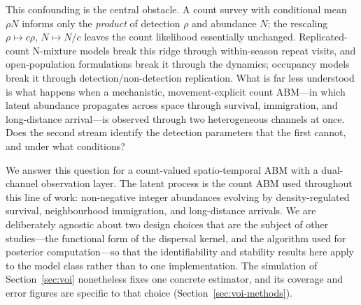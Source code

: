 \documentclass[preprint,12pt]{elsarticle}
\theoremstyle{definition}
\begin{document}
This confounding is the central obstacle. A count survey with conditional
mean $\rho N$ informs only the \emph{product} of detection $\rho$ and
abundance $N$; the rescaling $\rho\mapsto c\rho$, $N\mapsto N/c$ leaves the
count likelihood essentially unchanged. Replicated-count N-mixture models
\citep{royle2004} break this ridge through within-season repeat visits, and
open-population formulations \citep{dail2011} break it through the dynamics;
occupancy models break it through detection/non-detection replication. What
is far less understood is what happens when a mechanistic, movement-explicit
count ABM---in which latent abundance propagates across space through
survival, immigration, and long-distance arrival---is observed through two
heterogeneous channels at once. Does the second stream identify the
detection parameters that the first cannot, and under what conditions?

We answer this question for a count-valued spatio-temporal ABM with a
dual-channel observation layer. The latent process is the count ABM used
throughout this line of work: non-negative integer abundances evolving by
density-regulated survival, neighbourhood immigration, and long-distance
arrivals. We are deliberately agnostic about two design choices that are
the subject of other studies---the functional form of the dispersal
kernel, and the algorithm used for posterior computation---so that the
identifiability and stability results here apply to the model class rather
than to one implementation. The simulation of Section~\ref{sec:voi}
nonetheless fixes one concrete estimator, and its coverage and error figures
are specific to that choice (Section~\ref{sec:voi-methods}).
\end{document}
